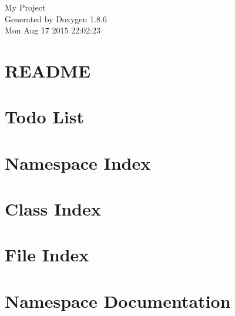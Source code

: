\documentclass[twoside]{book}
\newcommand{\clearemptydoublepage}{%
  \newpage{\pagestyle{empty}\cleardoublepage}%
}
\begin{document}
\hypersetup{pageanchor=false}
\begin{titlepage}
\vspace*{7cm}
\begin{center}%
{\Large My Project }\\
\vspace*{1cm}
{\large Generated by Doxygen 1.8.6}\\
\vspace*{0.5cm}
{\small Mon Aug 17 2015 22:02:23}\\
\end{center}
\end{titlepage}
\clearemptydoublepage
\tableofcontents
\clearemptydoublepage
{}
\hypersetup{pageanchor=true}

\chapter{R\-E\-A\-D\-M\-E}
\label{md_README}
\hypertarget{md_README}{}

\chapter{Todo List}
\label{todo}
\hypertarget{todo}{}

\chapter{Namespace Index}

\chapter{Class Index}

\chapter{File Index}

\chapter{Namespace Documentation}

\end{document}
